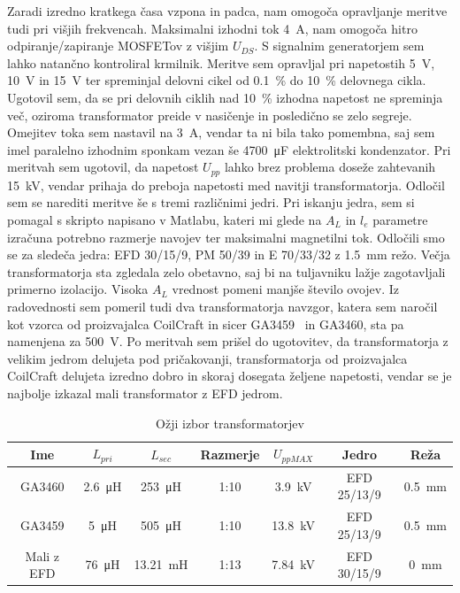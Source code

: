 \documentclass[a4paper,twoside,openright,12pt,Slovene]{book}
\begin{document}
Zaradi izredno kratkega časa vzpona in padca, nam omogoča opravljanje meritve tudi pri višjih frekvencah. Maksimalni izhodni tok \SI{4}{\ampere}, nam omogoča hitro odpiranje/zapiranje MOSFETov z višjim \(U_{DS}\). S signalnim generatorjem sem lahko natančno kontroliral krmilnik. Meritve sem opravljal pri napetostih \SI{5}{\volt}, \SI{10}{\volt} in \SI{15}{\volt} ter spreminjal delovni cikel od \SI{0.1}{\percent} do \SI{10}{\percent} delovnega cikla. Ugotovil sem, da se pri delovnih ciklih nad \SI{10}{\percent} izhodna napetost ne spreminja več, oziroma transformator preide v nasičenje in posledično se zelo segreje. Omejitev toka sem nastavil na \SI{3}{\ampere}, vendar ta ni bila tako pomembna, saj sem imel paralelno izhodnim sponkam vezan še \SI{4700}{\micro\farad} elektrolitski kondenzator. Pri meritvah sem ugotovil, da napetost \(U_{pp}\) lahko brez problema doseže zahtevanih \SI{15}{\kilo\volt}, vendar prihaja do preboja napetosti med navitji transformatorja. Odločil sem se narediti meritve še s tremi različnimi jedri. Pri iskanju jedra, sem si pomagal s skripto napisano v Matlabu, kateri mi glede na \(A_L\) in \(l_e\) parametre izračuna potrebno razmerje navojev ter maksimalni magnetilni tok. Odločili smo se za sledeča jedra: EFD 30/15/9, PM 50/39 in E 70/33/32 z \SI{1.5}{\milli\meter} režo. Večja transformatorja sta zgledala zelo obetavno, saj bi na tuljavniku lažje zagotavljali primerno izolacijo. Visoka \(A_L\) vrednost pomeni manjše število ovojev. Iz radovednosti sem pomeril tudi dva transformatorja navzgor, katera sem naročil kot vzorca od proizvajalca CoilCraft in sicer GA3459~\cite{Coilcraft:GA3459} in GA3460, sta pa namenjena za \SI{500}{\volt}. Po meritvah sem prišel do ugotovitev, da transformatorja z velikim jedrom delujeta pod pričakovanji, transformatorja od proizvajalca CoilCraft delujeta izredno dobro in skoraj dosegata željene napetosti, vendar se je najbolje izkazal mali transformator z EFD jedrom. 
 
\begin{table}[h!]
\centering
\begin{tabular}{||c|c|c|c|c|c|c||}
\hline
Ime & \(L_{pri}\) & \(L_{sec}\) & Razmerje & \(U_{pp MAX}\) & Jedro & Reža \\ [0.5ex]
\hline\hline
GA3460 & \SI{2.6}{\micro\henry} & \SI{253}{\micro\henry} & 1:10 & \SI{3.9}{\kilo\volt} & EFD 25/13/9 & \SI{0.5}{\milli\meter} \\
\hline
GA3459 & \SI{5}{\micro\henry} & \SI{505}{\micro\henry} & 1:10 & \SI{13.8}{\kilo\volt} & EFD 25/13/9 & \SI{0.5}{\milli\meter} \\
\hline
Mali z EFD & \SI{76}{\micro\henry} & \SI{13.21}{\milli\henry} & 1:13 & \SI{7.84}{\kilo\volt} & EFD 30/15/9 & \SI{0}{\milli\meter} \\
\hline
\end{tabular}

\caption{Ožji izbor transformatorjev}

\end{table}
\end{document}
